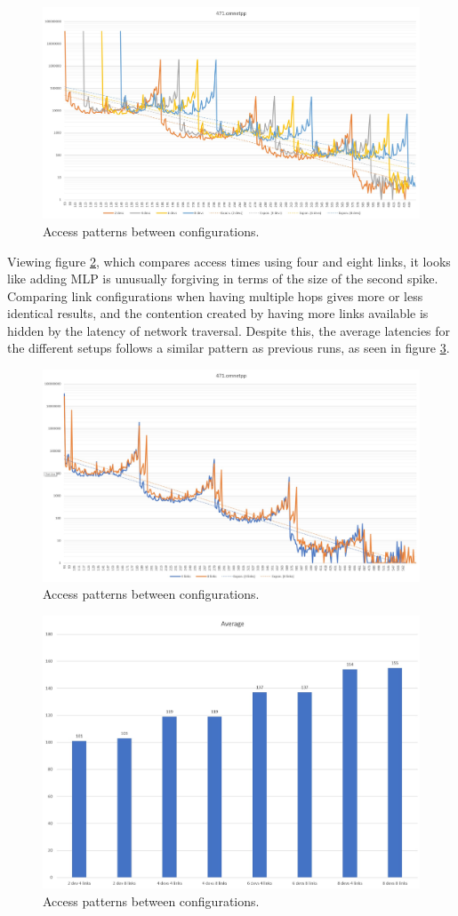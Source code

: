 \begin{figure}[!h]
    \centering
    \includegraphics[width=0.75\linewidth]{figure/471-x.4.jpg}
    \caption{Access patterns between configurations.}
    \label{Memory-access-471}
\end{figure}

Viewing figure \ref{Memory-access-471-link-compare}, which compares access times using four and eight links, it looks like adding MLP is unusually forgiving in terms of the size of the second spike. Comparing link configurations when having multiple hops gives more or less identical results, and the contention created by having more links available is hidden by the latency of network traversal. Despite this, the average latencies for the different setups follows a similar pattern as previous runs, as seen in figure \ref{Memory-access-471-averages}.

\begin{figure}[!h]
    \centering
    \includegraphics[width=0.75\linewidth]{figure/471-2.4-8.jpg}
    \caption{Access patterns between configurations.}
    \label{Memory-access-471-link-compare}
\end{figure}

\begin{figure}[!h]
    \centering
    \includegraphics[width=0.75\linewidth]{figure/471-averages.jpg}
    \caption{Access patterns between configurations.}
    \label{Memory-access-471-averages}
\end{figure}

